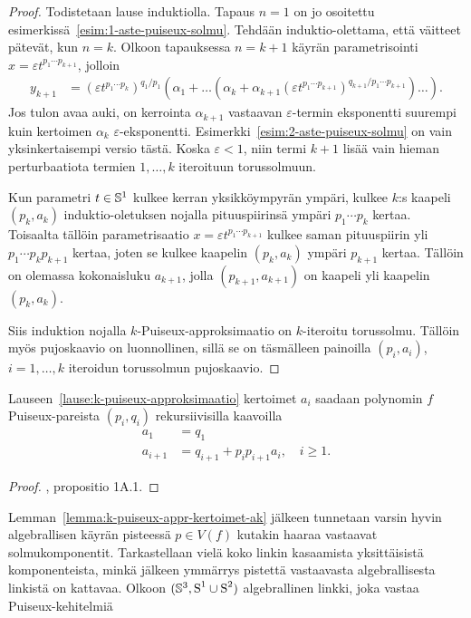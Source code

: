\begin{proof}
    Todistetaan lause induktiolla. Tapaus $n=1$ on jo osoitettu esimerkissä~\ref{esim:1-aste-puiseux-solmu}. Tehdään induktio-olettama, että väitteet pätevät, kun $n=k$. Olkoon tapauksessa $n=k+1$ käyrän parametrisointi $x=\varepsilon t^{p_1\cdots p_{k+1}}$, jolloin
    \begin{align*}
        y_{k+1}&=(\varepsilon t^{p_1\cdots p_k})^{q_1/p_1}(\alpha_1+\dots(\alpha_{k}+\alpha_{k+1}(\varepsilon t^{p_1\cdots p_{k+1}})^{q_{k+1}/p_1\cdots p_{k+1}})\dots).
    \end{align*}
    Jos tulon avaa auki, on kerrointa $\alpha_{k+1}$ vastaavan $\varepsilon$-termin eksponentti suurempi kuin kertoimen $\alpha_k$ $\varepsilon$-eksponentti. Esimerkki~\ref{esim:2-aste-puiseux-solmu} on vain yksinkertaisempi versio tästä. Koska $\varepsilon<1$, niin termi $k+1$ lisää vain hieman perturbaatiota termien $1,\dots,k$ iteroituun torussolmuun.

    Kun parametri $t\in\S^1$ kulkee kerran yksikköympyrän ympäri, kulkee $k$:s kaapeli $(p_k,a_k)$ induktio-oletuksen nojalla pituuspiirinsä ympäri $p_1\cdots p_k$ kertaa. Toisaalta tällöin parametrisaatio $x=\varepsilon t^{p_1\cdots p_{k+1}}$ kulkee saman pituuspiirin yli $p_1\cdots p_kp_{k+1}$ kertaa, joten se kulkee kaapelin $(p_k,a_k)$ ympäri $p_{k+1}$ kertaa. Tällöin on olemassa kokonaisluku $a_{k+1}$, jolla $(p_{k+1},a_{k+1})$ on kaapeli yli kaapelin $(p_k,a_k)$. 
    
    Siis induktion nojalla $k$-Puiseux-approksimaatio on $k$-iteroitu torussolmu. Tällöin myös pujoskaavio on luonnollinen, sillä se on täsmälleen painoilla $(p_i,a_i)$, $i=1,\dots,k$ iteroidun torussolmun pujoskaavio.
\end{proof}
\begin{lemma}
    \label{lemma:k-puiseux-appr-kertoimet-ak}
    Lauseen~\ref{lause:k-puiseux-approksimaatio} kertoimet $a_i$ saadaan polynomin $f$ Puiseux-pareista $(p_i,q_i)$ rekursiivisilla kaavoilla
    \begin{align*}
        a_1&=q_1 \\
        a_{i+1}&=q_{i+1}+p_ip_{i+1}a_i,\quad i\geq1.
    \end{align*}
\end{lemma}
\begin{proof}
    \citep{EN1985}, propositio 1A.1.
\end{proof}
Lemman~\ref{lemma:k-puiseux-appr-kertoimet-ak} jälkeen tunnetaan varsin hyvin algebrallisen käyrän pisteessä $p\in V(f)$ kutakin haaraa vastaavat solmukomponentit. Tarkastellaan vielä koko linkin kasaamista yksittäisistä komponenteista, minkä jälkeen ymmärrys pistettä vastaavasta algebrallisesta linkistä on kattavaa. Olkoon $(\S^3,\solmu^1\cup\solmu^2)$ algebrallinen linkki, joka vastaa Puiseux-kehitelmiä

